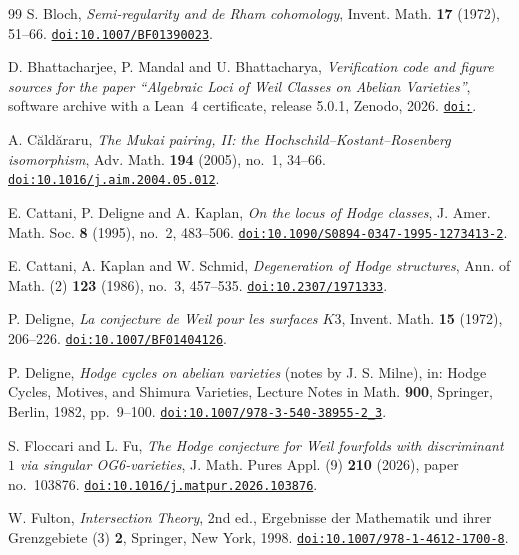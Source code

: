 \documentclass[11pt,reqno]{amsart}
\theoremstyle{plain}
\theoremstyle{definition}
\theoremstyle{remark}
\begin{document}
\begin{thebibliography}{99}
S. Bloch,
\emph{Semi-regularity and de Rham cohomology},
Invent. Math. \textbf{17} (1972), 51--66.
\href{https://doi.org/10.1007/BF01390023}{\texttt{doi:10.1007/BF01390023}}.

D. Bhattacharjee, P. Mandal and U. Bhattacharya,
\emph{Verification code and figure sources for the paper ``Algebraic Loci of
Weil Classes on Abelian Varieties''}, software archive with a Lean~4
certificate, release 5.0.1, Zenodo, 2026.
\href{https://doi.org/\zenodoCodeID}{\texttt{doi:\zenodoCodeID}}.

A. C\u{a}ld\u{a}raru,
\emph{The Mukai pairing, II: the Hochschild--Kostant--Rosenberg isomorphism},
Adv. Math. \textbf{194} (2005), no.~1, 34--66.
\href{https://doi.org/10.1016/j.aim.2004.05.012}{\texttt{doi:10.1016/j.aim.2004.05.012}}.

E. Cattani, P. Deligne and A. Kaplan,
\emph{On the locus of Hodge classes},
J. Amer. Math. Soc. \textbf{8} (1995), no.~2, 483--506.
\href{https://doi.org/10.1090/S0894-0347-1995-1273413-2}{\texttt{doi:10.1090/S0894-0347-1995-1273413-2}}.

E. Cattani, A. Kaplan and W. Schmid,
\emph{Degeneration of Hodge structures},
Ann. of Math. (2) \textbf{123} (1986), no.~3, 457--535.
\href{https://doi.org/10.2307/1971333}{\texttt{doi:10.2307/1971333}}.

P. Deligne,
\emph{La conjecture de Weil pour les surfaces $K3$},
Invent. Math. \textbf{15} (1972), 206--226.
\href{https://doi.org/10.1007/BF01404126}{\texttt{doi:10.1007/BF01404126}}.

P. Deligne,
\emph{Hodge cycles on abelian varieties} (notes by J. S. Milne),
in: Hodge Cycles, Motives, and Shimura Varieties,
Lecture Notes in Math. \textbf{900}, Springer, Berlin, 1982, pp.~9--100.
\href{https://doi.org/10.1007/978-3-540-38955-2_3}%
{\texttt{doi:10.1007/978-3-540-38955-2\_3}}.

S. Floccari and L. Fu,
\emph{The Hodge conjecture for Weil fourfolds with discriminant $1$ via
singular OG6-varieties},
J. Math. Pures Appl. (9) \textbf{210} (2026), paper no.~103876.
\href{https://doi.org/10.1016/j.matpur.2026.103876}{\texttt{doi:10.1016/j.matpur.2026.103876}}.

W. Fulton,
\emph{Intersection Theory}, 2nd ed.,
Ergebnisse der Mathematik und ihrer Grenzgebiete (3) \textbf{2},
Springer, New York, 1998.
\href{https://doi.org/10.1007/978-1-4612-1700-8}{\texttt{doi:10.1007/978-1-4612-1700-8}}.


\end{thebibliography}
\end{document}
